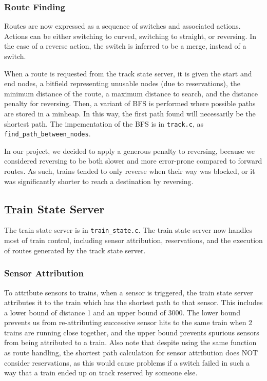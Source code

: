 \documentclass{article}
\begin{document}
\subsubsection{ Route Finding }
Routes are now expressed as a sequence of switches and associated actions. Actions can be either switching to curved, switching to straight, or reversing. In the case of a reverse action, the switch is inferred to be a merge, instead of a switch.

When a route is requested from the track state server, it is given the start and end nodes, a bitfield representing unusable nodes (due to reservations), the minimum distance of the route, a maximum distance to search, and the distance penalty for reversing. Then, a variant of BFS is performed where possible paths are stored in a minheap. In this way, the first path found will necessarily be the shortest path. 
The impementation of the BFS is in \verb|track.c|, as \verb|find_path_between_nodes|.

In our project, we decided to apply a generous penalty to reversing, because we considered reversing to be both slower and more error-prone compared to forward routes. As such, trains tended to only reverse when their way was blocked, or it was significantly shorter to reach a destination by reversing.

\subsection{ Train State Server}
The train state server is in \verb|train_state.c|.
The train state server now handles most of train control, including sensor attribution, reservations, and the execution of routes generated by the track state server.
\subsubsection{ Sensor Attribution}
To attribute sensors to trains, when a sensor is triggered, the train state server attributes it to the train which has the shortest path to that sensor.
This includes a lower bound of distance 1 and an upper bound of 3000. The lower bound prevents us from re-attributing successive sensor hits to the same train when 2 trains are running close together, and the upper bound prevents spurious sensors from being attributed to a train. Also note that despite using the same function as route handling, the shortest path calculation for sensor attribution does NOT consider reservations, as this would cause problems if a switch failed in such a way that a train ended up on track reserved by someone else.
\end{document}
